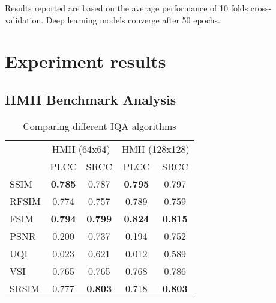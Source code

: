 Results reported are based on the average performance of 10 folds cross-validation. Deep learning models converge after 50 epochs.   


\section{Experiment results}

\subsection{HMII Benchmark Analysis}


\begin{table}[ht]
  \centering
  \begin{tabular}{|l|cc|cc|}
    \hline
    \multirow{2}{*}{} & \multicolumn{2}{c|}{ HMII (64x64) }      & \multicolumn{2}{c|}{ HMII (128x128) }    \\ \cline{2-5} 
    & PLCC           & SRCC           & PLCC           & SRCC           \\ \hline
    SSIM\cite{Wang2004}             & \textbf{0.785} & 0.787          & \textbf{0.795} & 0.797          \\
    RFSIM\cite{Zhang2010}             & 0.774          & 0.757          & 0.789          & 0.759          \\
    FSIM\cite{Zhang2011}              & \textbf{0.794} & \textbf{0.799} & \textbf{0.824} & \textbf{0.815} \\
    PSNR              & 0.200          & 0.737          & 0.194          & 0.752          \\
    UQI\cite{Wang2002}               & 0.023          & 0.621          & 0.012          & 0.589          \\
    VSI\cite{Zhang2014}               & 0.765          & 0.765          & 0.768          & 0.786          \\
    SRSIM\cite{Zhang2012}             & 0.777          & \textbf{0.803} & 0.718          & \textbf{0.803} \\ \hline
  \end{tabular}
  \caption{Comparing different IQA algorithms}
  \label{tab:algos}
\end{table}

